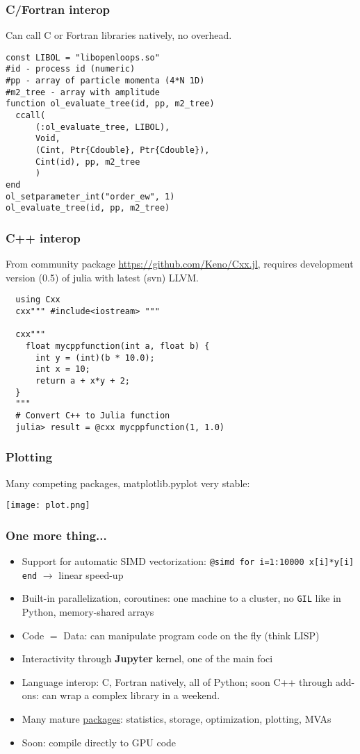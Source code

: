 \documentclass[16pt]{beamer}
\begin{document}
\begin{frame}[fragile]
  \frametitle{C/Fortran interop}
  Can call C or Fortran libraries natively, no overhead.

  \begin{lstlisting}
const LIBOL = "libopenloops.so"
#id - process id (numeric)
#pp - array of particle momenta (4*N 1D)
#m2_tree - array with amplitude
function ol_evaluate_tree(id, pp, m2_tree)
  ccall(
      (:ol_evaluate_tree, LIBOL),
      Void,
      (Cint, Ptr{Cdouble}, Ptr{Cdouble}),
      Cint(id), pp, m2_tree
      )
end
ol_setparameter_int("order_ew", 1)
ol_evaluate_tree(id, pp, m2_tree)
  \end{lstlisting}
\end{frame}

\begin{frame}[fragile]
  \frametitle{C++ interop}
  From community package \href{Cxx.jl}{https://github.com/Keno/Cxx.jl}, requires development version (0.5) of julia with latest (svn) LLVM.

  \begin{lstlisting}
  using Cxx
  cxx""" #include<iostream> """  

  cxx"""
    float mycppfunction(int a, float b) {   
      int y = (int)(b * 10.0);
      int x = 10;
      return a + x*y + 2;
  }
  """
  # Convert C++ to Julia function
  julia> result = @cxx mycppfunction(1, 1.0)
  \end{lstlisting}

\end{frame}

\begin{frame}[fragile]
  \frametitle{Plotting}
  Many competing packages, matplotlib.pyplot very stable:

  \begin{center}
    \texttt{[image: plot.png]}
  \end{center}
\end{frame}

\begin{frame}[fragile]
  \frametitle{One more thing...}
  \begin{itemize}
    \item Support for automatic SIMD vectorization: \texttt{@simd for i=1:10000 x[i]*y[i] end} $\rightarrow$ linear speed-up
    \item Built-in parallelization, coroutines: one machine to a cluster, no \texttt{GIL} like in Python, memory-shared arrays
    \item Code $=$ Data: can manipulate program code on the fly (think LISP)
    \item Interactivity through \textbf{Jupyter} kernel, one of the main foci
    \item Language interop: C, Fortran natively, all of Python; soon C++ through add-ons: can wrap a complex library in a weekend.
    \item Many mature \href{http://pkg.julialang.org/}{packages}: statistics, storage, optimization, plotting, MVAs
    \item Soon: compile directly to GPU code
  \end{itemize}
\end{frame}
\end{document}

